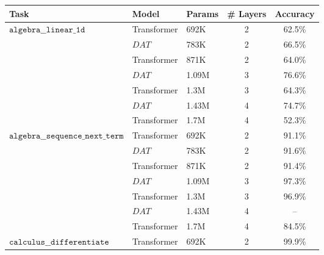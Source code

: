 \begin{tabular}{l|l|l|c|c}
    \toprule
    Task                                                      & Model                & Params & \# Layers & Accuracy \\
    \midrule
    \multirow{7}{*}{$\texttt{algebra\_\_linear\_1d}$}         & Transformer          & 692K   & 2         & 62.5\%   \\
                                                              & $DAT$                & 783K   & 2         & 66.5\%   \\
                                                              & Transformer          & 871K   & 2         & 64.0\%   \\
                                                              & $DAT$                & 1.09M  & 3         & 76.6\%   \\
                                                              & Transformer          & 1.3M   & 3         & 64.3\%   \\
                                                              & $DAT$                & 1.43M  & 4         & 74.7\%   \\
                                                              & Transformer          & 1.7M   & 4         & 52.3\%   \\
    \cline{1-5}
    \multirow{7}{*}{$\texttt{algebra\_\_sequence\_next\_term}$} & Transformer        & 692K   & 2         & 91.1\%   \\
                                                              & $DAT$                & 783K   & 2         & 91.6\%   \\
                                                              & Transformer          & 871K   & 2         & 91.4\%   \\
                                                              & $DAT$                & 1.09M  & 3         & 97.3\%   \\
                                                              & Transformer          & 1.3M   & 3         & 96.9\%   \\
                                                              & $DAT$                & 1.43M  & 4         & --       \\
                                                              & Transformer          & 1.7M   & 4         & 84.5\%   \\
    \cline{1-5}
    \multirow{7}{*}{$\texttt{calculus\_\_differentiate}$}     & Transformer          & 692K   & 2         & 99.9\%   \\

\end{tabular}

